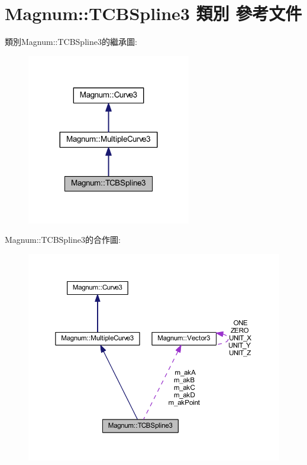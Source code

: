 \hypertarget{class_magnum_1_1_t_c_b_spline3}{}\section{Magnum\+:\+:T\+C\+B\+Spline3 類別 參考文件}
\label{class_magnum_1_1_t_c_b_spline3}


類別\+Magnum\+:\+:T\+C\+B\+Spline3的繼承圖\+:\nopagebreak
\begin{figure}[H]
\begin{center}
\leavevmode
\includegraphics[width=203pt]{class_magnum_1_1_t_c_b_spline3__inherit__graph}
\end{center}
\end{figure}


Magnum\+:\+:T\+C\+B\+Spline3的合作圖\+:\nopagebreak
\begin{figure}[H]
\begin{center}
\leavevmode
\includegraphics[width=350pt]{class_magnum_1_1_t_c_b_spline3__coll__graph}
\end{center}
\end{figure}
